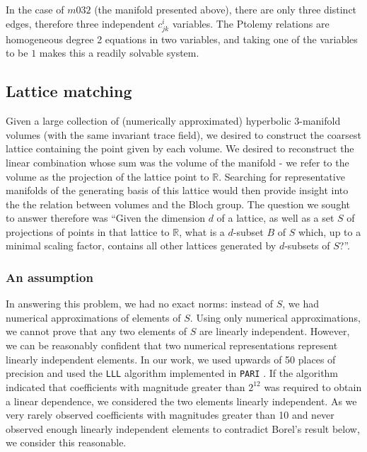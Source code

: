 \documentclass[10pt]{amsart}
\numberwithin{equation}{theorem}
\theoremstyle{definition}
\newcommand{\prog}[1]{\texttt{#1}}
\begin{document}
In the case of $m032$ (the manifold presented above), there are only three
distinct edges, therefore three independent $c^i_{jk}$ variables. The
Ptolemy relations are homogeneous degree 2 equations in two variables,
and taking one of the variables to be $1$ makes this a readily solvable
system.

\subsection{Lattice matching}

Given a large collection of (numerically approximated) hyperbolic
3-manifold volumes (with the same invariant trace field), we desired
to construct the coarsest lattice containing the point given by each
volume. We desired to reconstruct the linear combination whose sum was
the volume of the manifold - we refer to the volume as the projection
of the lattice point to $\mathbb{R}$. Searching for representative
manifolds of the generating basis of this lattice would then provide
insight into the the relation between volumes and the Bloch group. The
question we sought to answer therefore was ``Given the dimension $d$
of a lattice, as well as a set $S$ of projections of points in that
lattice to $\mathbb{R}$, what is a $d$-subset $B$ of $S$ which, up to
a minimal scaling factor, contains all other lattices generated by
$d$-subsets of $S$?''.

\subsubsection{An assumption}
\label{sec:an-assumption}

In answering this problem, we had no exact norms: instead of $S$, we
had numerical approximations of elements of $S$. Using only numerical
approximations, we cannot prove that any two elements of $S$ are linearly
independent. However, we can be reasonably confident that two numerical
representations represent linearly independent elements.  In our work, we
used upwards of 50 places of precision and used the \prog{LLL} algorithm
implemented in \prog{PARI} \parencite{PARI2}.  If the algorithm indicated
that coefficients with magnitude greater than $2^{12}$ was required
to obtain a linear dependence, we considered the two elements linearly
independent.  As we very rarely observed coefficients with magnitudes
greater than 10 and never observed enough linearly independent elements
to contradict Borel's result below, we consider this reasonable.
\end{document}
